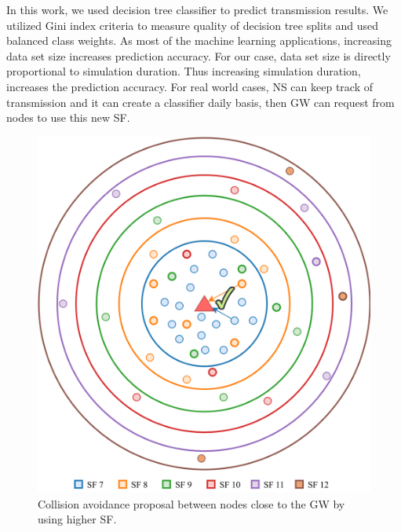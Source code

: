 \documentclass[conference]{IEEEtran}
\begin{document}
\par In this work, we used decision tree classifier to predict transmission results. We utilized Gini index criteria to measure quality of decision tree splits and used balanced class weights. As most of the machine learning applications, increasing data set size increases prediction accuracy. For our case, data set size is directly proportional to simulation duration. Thus increasing simulation duration, increases the prediction accuracy. For real world cases, NS can keep track of transmission and it can create a classifier daily basis, then GW can request from nodes to use this new SF.

\begin{figure}
\centering
\includegraphics[width=\linewidth]{collision_solution_single_gw}
\caption{Collision avoidance proposal between nodes close to the GW by using higher SF.}
\label{fig:collision_solution_single_gw}
\end{figure}
\end{document}
